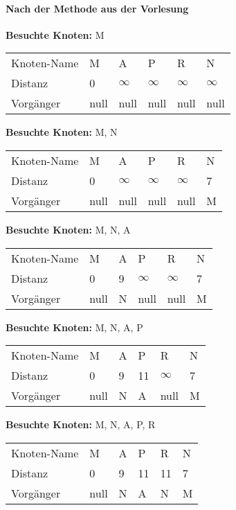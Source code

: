 \documentclass{lehramt-informatik-aufgabe}
\begin{document}
\begin{enumerate}
\paragraph{Nach der Methode aus der Vorlesung}

\textbf{Besuchte Knoten:} M

\begin{tabular}{l||l|l|l|l|l}
Knoten-Name & M    & A        & P        & R        & N  \\
Distanz     & 0    & $\infty$ & $\infty$ & $\infty$ & $\infty$ \\
Vorgänger   & null & null     & null     & null     & null \\
\end{tabular}

\textbf{Besuchte Knoten:} M, N

\begin{tabular}{l||l|l|l|l|l}
Knoten-Name & M    & A        & P        & R        & N  \\
Distanz     & 0    & $\infty$ & $\infty$ & $\infty$ & 7 \\
Vorgänger   & null & null     & null     & null     & M \\
\end{tabular}

\textbf{Besuchte Knoten:} M, N, A

\begin{tabular}{l||l|l|l|l|l}
Knoten-Name & M    & A        & P        & R        & N  \\
Distanz     & 0    & 9        & $\infty$ & $\infty$ & 7 \\
Vorgänger   & null & N        & null     & null     & M \\
\end{tabular}

\textbf{Besuchte Knoten:} M, N, A, P

\begin{tabular}{l||l|l|l|l|l}
Knoten-Name & M    & A        & P        & R        & N  \\
Distanz     & 0    & 9        & 11       & $\infty$ & 7 \\
Vorgänger   & null & N        & A        & null     & M \\
\end{tabular}

\textbf{Besuchte Knoten:} M, N, A, P, R

\begin{tabular}{l||l|l|l|l|l}
Knoten-Name & M    & A        & P        & R        & N  \\
Distanz     & 0    & 9        & 11       & 11       & 7 \\
Vorgänger   & null & N        & A        & N        & M \\
\end{tabular}


\end{enumerate}
\end{document}
